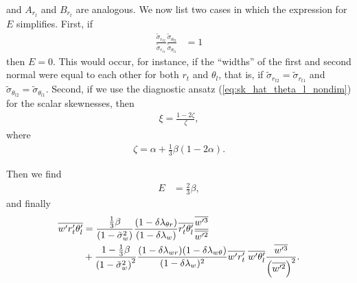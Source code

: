 and $A_{r_t}$ and $B_{r_t}$ are analogous.
We now list two cases in which the expression for $E$ simplifies.
First, if
\begin{align*}
    \frac{\tilde{\sigma}_{r_{t2}}}{\tilde{\sigma}_{r_{t1}}} \frac{\tilde{\sigma}_{\theta_{l2}}}{\tilde{\sigma}_{\theta_{l1}}}
    &= 1
\end{align*}
then $E=0$.
This would occur, for instance,
if the \enquote{widths} of the first and second normal were equal to each other for both $r_t$ and $\theta_l$,
that is, if $\tilde{\sigma}_{r_{t2}} = \tilde{\sigma}_{r_{t1}}$
and $\tilde{\sigma}_{\theta_{l2}} = \tilde{\sigma}_{\theta_{l1}}$.
Second, if we use the diagnostic ansatz (\cref{eq:sk_hat_theta_l_nondim}) for the scalar skewnesses, then
\begin{align}
    \label{eq:xi}
    \xi = \frac{1 - 2 \zeta}{\zeta},
\end{align}
where
\begin{align}
    \label{eq:zeta}
    \zeta = \alpha + \frac{1}{3} \beta \left(1 - 2 \alpha \right).
\end{align}

Then we find
\begin{align}
    \label{eq:E_eq_23beta}
    E &= \frac{2}{3} \beta,
\end{align}
and finally
\begin{align}
    \label{eq:wpqtpthlp_beta}
    \overline{w' r_t' \theta_l'}
    &= \frac{\frac{1}{3}\beta}{\left( 1 - \tilde{\sigma}_w^2 \right)}
    \frac{(1-\delta \lambda_{\theta r})}{(1 - \delta \lambda_w)}
    \overline{r_t' \theta_l'} \frac{\overline{w'^3}}{\overline{w'^2}} \nonumber\\
    &+ \frac{1 - \frac{1}{3}\beta}{\left( 1 - \tilde{\sigma}_w^2 \right)^2}
    \frac{(1-\delta \lambda_{w r})(1-\delta \lambda_{w \theta})} {(1 - \delta \lambda_w)^2}
    \overline{w' r_t'} \; \overline{w' \theta_l'} \frac{\overline{w'^3}}{\left( \overline{w'^2} \right)^2}.
\end{align}